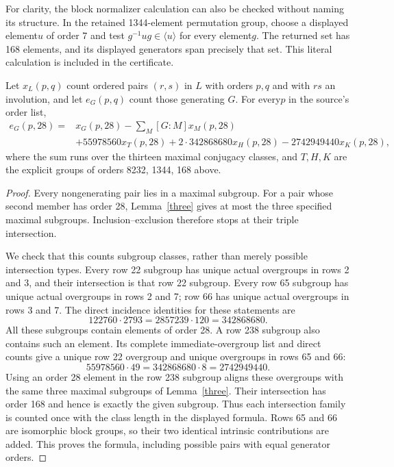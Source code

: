 \documentclass[11pt,a4paper]{article}
\begin{document}
For clarity, the block normalizer calculation can also be checked
without naming its structure. In the retained 1344-element permutation
group, choose a displayed element$u$ of order 7 and test
$g^{-1}ug\in\langle u\rangle$ for every element$g$. The returned set
has 168 elements, and its displayed generators span precisely that set.
This literal calculation is included in the certificate.

\begin{theorem}\label{formula}
Let $x_L(p,q)$ count ordered pairs $(r,s)$ in $L$ with orders $p,q$
and with $rs$ an involution, and let $e_G(p,q)$ count those generating $G$.
For every$p$ in the source's order list,
\begin{align*}
 e_G(p,28)={}&x_G(p,28)-\sum_{M}[G:M]x_M(p,28)\\
 &+55978560x_{T}(p,28)
  +2\cdot342868680x_{H}(p,28)
  -2742949440x_{K}(p,28),
\end{align*}
where the sum runs over the thirteen maximal conjugacy classes,
and $T,H,K$ are the explicit groups of orders 8232, 1344, 168 above.
\end{theorem}
\begin{proof}
Every nongenerating pair lies in a maximal subgroup. For a pair whose
second member has order 28, Lemma~\ref{three} gives at most the three
specified maximal subgroups. Inclusion--exclusion therefore stops at
their triple intersection.

We check that this counts subgroup classes, rather than merely
possible intersection types. Every row 22 subgroup has unique actual
overgroups in rows 2 and 3, and their intersection is that row 22 subgroup.
Every row 65 subgroup has unique actual overgroups in rows 2 and 7;
row 66 has unique actual overgroups in rows 3 and 7. The direct incidence
identities for these statements are
\[
 122760\cdot2793=2857239\cdot120=342868680.
\]
All these subgroups contain elements of order 28. A row 238 subgroup
also contains such an element. Its complete immediate-overgroup list
and direct counts give a unique row 22 overgroup and unique overgroups
in rows 65 and 66:
\[
 55978560\cdot49=342868680\cdot8=2742949440.
\]
Using an order 28 element in the row 238 subgroup aligns these overgroups
with the same three maximal subgroups of Lemma~\ref{three}. Their
intersection has order 168 and hence is exactly the given subgroup.
Thus each intersection family is counted once with the class length
in the displayed formula. Rows 65 and 66 are isomorphic block groups,
so their two identical intrinsic contributions are added. This proves
the formula, including possible pairs with equal generator orders.
\end{proof}
\end{document}
